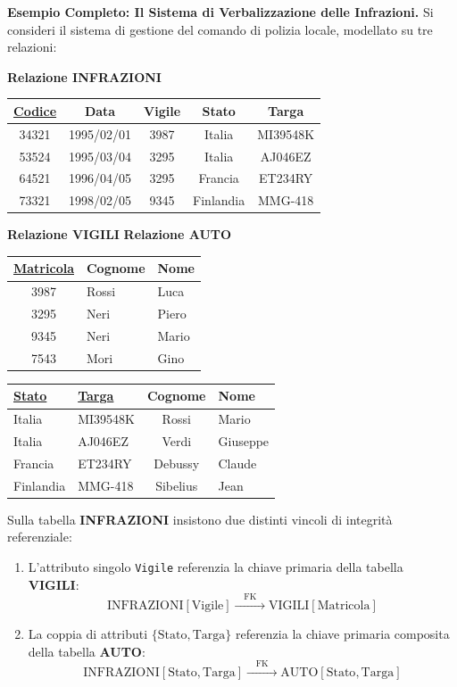 \documentclass[12pt]{extarticle}
\begin{document}
\medskip
\noindent \textbf{Esempio Completo: Il Sistema di Verbalizzazione delle Infrazioni.} Si consideri il sistema di gestione del comando di polizia locale, modellato su tre relazioni:
\begin{center}
\small
\textbf{Relazione INFRAZIONI} \\[1ex]
\begin{tabular}{ccccc}
    \toprule
    \textbf{\underline{Codice}} & \textbf{Data} & \textbf{Vigile} & \textbf{Stato} & \textbf{Targa} \\
    \midrule
    34321 & 1995/02/01 & 3987 & Italia & MI39548K \\
    53524 & 1995/03/04 & 3295 & Italia & AJ046EZ \\
    64521 & 1996/04/05 & 3295 & Francia & ET234RY \\
    73321 & 1998/02/05 & 9345 & Finlandia & MMG-418 \\
    \bottomrule
\end{tabular}
\end{center}
\medskip
\begin{center}
\small
\textbf{Relazione VIGILI} \qquad \qquad \textbf{Relazione AUTO} \\[1ex]
\begin{tabular}{cll}
    \toprule
    \textbf{\underline{Matricola}} & \textbf{Cognome} & \textbf{Nome} \\
    \midrule
    3987 & Rossi & Luca \\
    3295 & Neri & Piero \\
    9345 & Neri & Mario \\
    7543 & Mori & Gino \\
    \bottomrule
\end{tabular}
\qquad
\begin{tabular}{llcl}
    \toprule
    \textbf{\underline{Stato}} & \textbf{\underline{Targa}} & \textbf{Cognome} & \textbf{Nome} \\
    \midrule
    Italia & MI39548K & Rossi & Mario \\
    Italia & AJ046EZ & Verdi & Giuseppe \\
    Francia & ET234RY & Debussy & Claude \\
    Finlandia & MMG-418 & Sibelius & Jean \\
    \bottomrule
\end{tabular}
\end{center}
\medskip
\noindent Sulla tabella \textbf{INFRAZIONI} insistono due distinti vincoli di integrità referenziale:
\begin{enumerate}
    \item L'attributo singolo \texttt{Vigile} referenzia la chiave primaria della tabella \textbf{VIGILI}:
    $$\text{INFRAZIONI}[\text{Vigile}] \xrightarrow{\quad \text{FK} \quad} \text{VIGILI}[\text{Matricola}]$$
    \item La coppia di attributi $\{\text{Stato}, \text{Targa}\}$ referenzia la chiave primaria composita della tabella \textbf{AUTO}:
    $$\text{INFRAZIONI}[\text{Stato}, \text{Targa}] \xrightarrow{\quad \text{FK} \quad} \text{AUTO}[\text{Stato}, \text{Targa}]$$
\end{enumerate}
\end{document}

